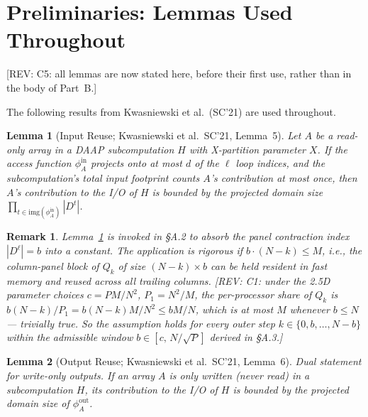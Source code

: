 \documentclass[11pt]{article}
\newcommand{\REV}[1]{\textcolor{blue!60!black}{\small\textsf{[REV: #1]}}}
\newtheorem{lemma}{Lemma}
\newtheorem{remark}{Remark}
\begin{document}
\newpage

\section*{Preliminaries: Lemmas Used Throughout}

\REV{C5: all lemmas are now stated here, before their first use, rather
than in the body of Part~B.}

The following results from Kwasniewski et al.\ (SC'21) are used throughout.

\begin{lemma}[Input Reuse; Kwasniewski et al.\ SC'21, Lemma~5]
\label{lem:input-reuse}
Let $A$ be a read-only array in a DAAP subcomputation $H$ with X-partition
parameter $X$. If the access function $\phi^{\mathrm{in}}_A$ projects
onto at most $d$ of the $\ell$ loop indices, and the subcomputation's
total input footprint counts $A$'s contribution at most once, then
$A$'s contribution to the I/O of $H$ is bounded by the projected domain
size $\prod_{t \in \mathrm{img}(\phi^{\mathrm{in}}_A)} |D^t|$.
\end{lemma}

\begin{remark}
\label{rem:bN-bound}
Lemma~\ref{lem:input-reuse} is invoked in \S A.2 to absorb the panel
contraction index $|D^\ell| = b$ into a constant. The application is
rigorous if $b \cdot (N-k) \le M$, i.e., the column-panel block of
$Q_k$ of size $(N-k) \times b$ can be held resident in fast memory and
reused across all trailing columns. \REV{C1: under the 2.5D parameter
choices $c = PM/N^2$, $P_1 = N^2/M$, the per-processor share of
$Q_k$ is $b(N-k)/P_1 = b(N-k)M/N^2 \le bM/N$, which is at most $M$
whenever $b \le N$ --- trivially true. So the assumption holds for
\emph{every} outer step $k \in \{0,b,\ldots,N-b\}$ within the admissible
window $b \in [c,\, N/\sqrt{P}]$ derived in \S A.3.}
\end{remark}

\begin{lemma}[Output Reuse; Kwasniewski et al.\ SC'21, Lemma~6]
\label{lem:output-reuse}
Dual statement for write-only outputs. If an array $A$ is only written
(never read) in a subcomputation $H$, its contribution to the I/O of $H$
is bounded by the projected domain size of $\phi^{\mathrm{out}}_A$.
\end{lemma}
\end{document}
